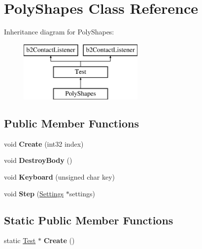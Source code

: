\hypertarget{class_poly_shapes}{\section{Poly\-Shapes Class Reference}
\label{class_poly_shapes}
}
Inheritance diagram for Poly\-Shapes\-:\begin{figure}[H]
\begin{center}
\leavevmode
\includegraphics[height=3.000000cm]{class_poly_shapes}
\end{center}
\end{figure}
\subsection*{Public Member Functions}
\begin{DoxyCompactItemize}
\item 
\hypertarget{class_poly_shapes_af5b877db3b2a7fc00a65ba8164ce5e8d}{void {\bfseries Create} (int32 index)}\label{class_poly_shapes_af5b877db3b2a7fc00a65ba8164ce5e8d}

\item 
\hypertarget{class_poly_shapes_aa25f535108704d0d1f46f359f7523cd0}{void {\bfseries Destroy\-Body} ()}\label{class_poly_shapes_aa25f535108704d0d1f46f359f7523cd0}

\item 
\hypertarget{class_poly_shapes_a1955bcb25e8f62dc8e4b4f9dc0de1412}{void {\bfseries Keyboard} (unsigned char key)}\label{class_poly_shapes_a1955bcb25e8f62dc8e4b4f9dc0de1412}

\item 
\hypertarget{class_poly_shapes_a653c8d15bf6ba12077862daa335aba1e}{void {\bfseries Step} (\hyperlink{struct_settings}{Settings} $\ast$settings)}\label{class_poly_shapes_a653c8d15bf6ba12077862daa335aba1e}

\end{DoxyCompactItemize}
\subsection*{Static Public Member Functions}
\begin{DoxyCompactItemize}
\item 
\hypertarget{class_poly_shapes_a2f2e70c6f19d2a2b75299b3a1b56f475}{static \hyperlink{class_test}{Test} $\ast$ {\bfseries Create} ()}\label{class_poly_shapes_a2f2e70c6f19d2a2b75299b3a1b56f475}

\end{DoxyCompactItemize}
